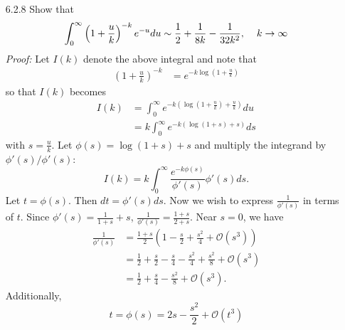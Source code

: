 \documentclass{article}
\begin{document}
\begin{itemize}
    \item[6.2.8] Show that
    \[\int_0^{\infty} \left(1 + \frac{u}{k}\right)^{-k}e^{-u} du\sim \frac{1}{2} + \frac{1}{8k} - \frac{1}{32k^2}, \hspace{0.4cm} k \to \infty \]
    \textit{Proof:} Let $I(k)$ denote the above integral and note that
    \begin{align*}
        \left(1 + \frac{u}{k}\right)^{-k} &= e^{-k\log\left(1 + \tfrac{u}{k}\right)}
    \end{align*}
    so that $I(k)$ becomes
    \begin{align*}
        I(k) &= \int_0^{\infty}e^{-k\left(\log\left(1 + \tfrac{u}{k}\right) + \tfrac{u}{k}\right)}du\\
        &= k\int_0^{\infty}e^{-k\left(\log(1 + s) + s\right)}ds
    \end{align*}
    with $s = \tfrac{u}{k}$. Let $\phi(s) = \log(1 + s) + s$ and multiply the integrand by $\phi'(s)/\phi'(s)$:
    \[I(k) = k\int_0^{\infty} \frac{e^{-k\phi(s)}}{\phi'(s)}\phi'(s)ds.\]
    Let $t = \phi(s)$. Then $dt = \phi'(s)ds$. Now we wish to express $\frac{1}{\phi'(s)}$ in terms of $t$. Since $\phi'(s) = \frac{1}{1 + s} + s$, $\frac{1}{\phi'(s)} = \frac{1 + s}{2 + s}$. Near $s = 0$, we have
    \begin{align*}
        \frac{1}{\phi'(s)} &= \frac{1 + s}{2}\left(1 - \frac{s}{2} + \frac{s^2}{4} + \mathcal{O}(s^3)\right)\\
        &= \frac{1}{2} + \frac{s}{2} - \frac{s}{4} - \frac{s^2}{4} + \frac{s^2}{8} + \mathcal{O}(s^3)\\
        &= \frac{1}{2} + \frac{s}{4} - \frac{s^2}{8} + \mathcal{O}(s^3).
    \end{align*}
    Additionally,
    \[t = \phi(s) = 2s - \frac{s^2}{2} + \mathcal{O}(t^3)\]
    

\end{itemize}
\end{document}
